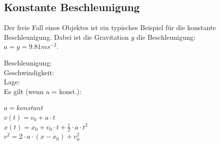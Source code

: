 \subsection{Konstante Beschleunigung}

Der freie Fall eines Objektes ist ein typisches Beispiel für die konstante Beschleunigung.
Dabei ist die Gravitation $g$ die Beschleunigung: $a = g = 9.81ms^{-2}$.

\begin{equbox}
    \begin{minipage}{.3\textwidth}
        Beschleunigung: \\
        Geschwindigkeit: \\
        Lage: \\
        Es gilt (wenn a = konst.):
    \end{minipage}
    \hspace{.1\textwidth}
    \begin{minipage}{.3\textwidth}
        $a = konstant$ \\
        $v(t) = v_0 + a \cdot t$ \\
        $x(t) = x_0 + v_0 \cdot t + \frac{1}{2} \cdot a \cdot t^2$ \\
        $v^2 = 2 \cdot a \cdot (x - x_0) + v_0^2$
    \end{minipage}
\end{equbox}

